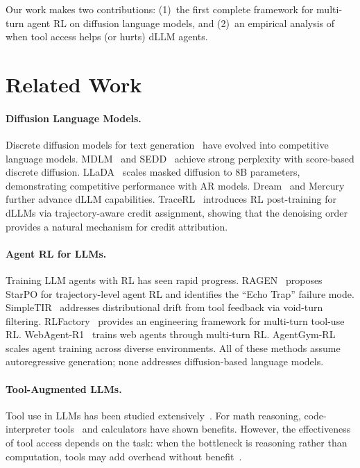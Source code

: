 \documentclass{article}
\begin{document}
Our work makes two contributions: (1)~the first complete framework for multi-turn agent RL on diffusion language models, and (2)~an empirical analysis of when tool access helps (or hurts) dLLM agents.

\section{Related Work}

\paragraph{Diffusion Language Models.}
Discrete diffusion models for text generation~\citep{austin2021d3pm, he2022diffusionbert} have evolved into competitive language models. MDLM~\citep{lou2024mdlm} and SEDD~\citep{lou2024sedd} achieve strong perplexity with score-based discrete diffusion. LLaDA~\citep{nie2025llada} scales masked diffusion to 8B parameters, demonstrating competitive performance with AR models. Dream~\citep{dream2025} and Mercury~\citep{mercury2025} further advance dLLM capabilities. TraceRL~\citep{tracerl2025} introduces RL post-training for dLLMs via trajectory-aware credit assignment, showing that the denoising order provides a natural mechanism for credit attribution.

\paragraph{Agent RL for LLMs.}
Training LLM agents with RL has seen rapid progress. RAGEN~\citep{wang2025ragen} proposes StarPO for trajectory-level agent RL and identifies the ``Echo Trap'' failure mode. SimpleTIR~\citep{xue2025simpletir} addresses distributional drift from tool feedback via void-turn filtering. RLFactory~\citep{chai2025rlfactory} provides an engineering framework for multi-turn tool-use RL. WebAgent-R1~\citep{wei2025webagent} trains web agents through multi-turn RL. AgentGym-RL~\citep{xi2025agentgym} scales agent training across diverse environments. All of these methods assume autoregressive generation; none addresses diffusion-based language models.

\paragraph{Tool-Augmented LLMs.}
Tool use in LLMs has been studied extensively~\citep{schick2023toolformer, qin2023tool}. For math reasoning, code-interpreter tools~\citep{gou2024tora} and calculators have shown benefits. However, the effectiveness of tool access depends on the task: when the bottleneck is reasoning rather than computation, tools may add overhead without benefit~\citep{wang2024mathshepherd}.
\end{document}
